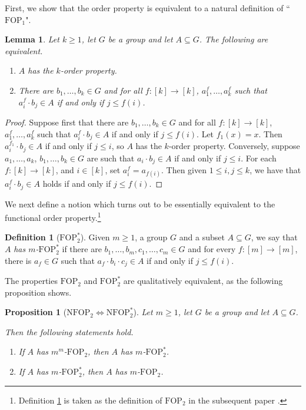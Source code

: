 \documentclass[12pt,oneside,british,a4wide]{amsart}
\newtheorem{lemma}[theorem]{Lemma}
\newtheorem{proposition}[theorem]{Proposition}
\numberwithin{equation}{section}
\theoremstyle{definition}
\newtheorem{definition}[theorem]{Definition}
\def\FOP{\mathrm{FOP}}
\def\NFOP{\mathrm{NFOP}}
\begin{document}
First, we show that the order property is equivalent to a natural definition of ``$\FOP_1$".

\begin{lemma}\label{lem:opfop1}
Let $k\geq 1$, let $G$ be a group and let $A\subseteq G$.  The following are equivalent.
\begin{enumerate}[label=\normalfont(\roman*)]
\item $A$ has the $k$-order property.
\item There are $b_1,\ldots, b_k\in G$ and  for all $f:[k]\rightarrow [k]$, $a_1^f,\ldots, a_k^f$ such that $a_i^f\cdot b_j\in A$ if and only if $j\leq f(i)$.
\end{enumerate}
\end{lemma}
\begin{proof} Suppose first that there are $b_1,\ldots, b_k\in G$ and  for all $f:[k]\rightarrow [k]$, $a_1^f,\ldots, a_k^f$ such that $a_i^f\cdot b_j\in A$ if and only if $j\leq f(i)$.  Let $f_1(x)=x$.  Then $a_i^{f_1}\cdot b_j\in A$ if and only if $j\leq i $, so $A$ has the $k$-order property. Conversely, suppose $a_1,\ldots, a_k$, $b_1,\ldots, b_k\in G$ are such that $a_i\cdot b_j\in A$ if and only if $j\leq i$.  For each  $f:[k]\rightarrow [k]$, and $i\in [k]$, set $a^f_i=a_{f(i)}$.  Then given $1\leq i,j\leq k$, we have that $a_i^f\cdot b_j\in A$ holds if and only if $j\leq f(i)$.
\end{proof}

We next define a notion which turns out to be essentially equivalent to the functional order property.\footnote{Definition \ref{def:fopstar} is taken as the definition of $\FOP_2$ in the subsequent paper \cite{Abd.2025}.}

\begin{definition}[$\FOP_2^*$]\label{def:fopstar}
Given $m\geq 1$, a group $G$ and a subset $A\subseteq G$, we say that $A$ \emph{has $m$-$\FOP_2^*$} if there are $b_1,\ldots,b_m,c_1,\ldots,c_m\in G$ and for every $f:[m]\rightarrow [m]$, there is $a_f\in G$ such that  $a_f\cdot b_i\cdot c_j\in A$ if and only if $j\leq f(i)$.
\end{definition}

The properties $\FOP_2$ and $\FOP_2^*$ are qualitatively equivalent, as the following proposition shows.

\begin{proposition}[$\NFOP_2\Leftrightarrow \mathrm{NFOP}_2^*$]\label{prop:fopstar}
Let $m\geq 1$, let $G$ be a group and let $A\subseteq G$. 

Then the following statements hold.
\begin{enumerate}[label=\normalfont(\roman*)]
\item If $A$ has $m^m$-$\FOP_2$, then $A$ has $m$-$\FOP_2^*$.
\item If $A$ has $m$-$\FOP^*_2$, then $A$ has $m$-$\FOP_2$.
\end{enumerate}
\end{proposition}
\end{document}
